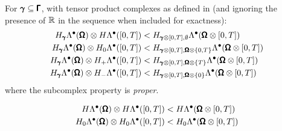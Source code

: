             \noindent\makebox[\linewidth]{\rule{\textwidth}{0.4pt}}
            \begin{lemma}
                For $\pmb{\mathsf{\gamma}}  \subseteq  \pmb{\mathsf{\Gamma}}$, with tensor product complexes as defined in \cite{ABB15} (and ignoring the presence of $\mathbb{R}$ in the sequence when included for exactness):
                \begin{align}
                    H_{\pmb{\mathsf{\gamma}}}\Lambda^{\bullet}(\pmb{\mathsf{\Omega}})\otimes H\Lambda^{\bullet}([0, T])  &<  H_{\pmb{\mathsf{\gamma}}\otimes[0, T], \emptyset}\Lambda^{\bullet}(\pmb{\mathsf{\Omega}}\otimes[0, T])  \\
                    H_{\pmb{\mathsf{\gamma}}}\Lambda^{\bullet}(\pmb{\mathsf{\Omega}})\otimes H_{0}\Lambda^{\bullet}([0, T])  &<  H_{\pmb{\mathsf{\gamma}}\otimes[0, T], \pmb{\mathsf{\Omega}}\otimes\{0, T\}}\Lambda^{\bullet}(\pmb{\mathsf{\Omega}}\otimes[0, T])  \\
                    H_{\pmb{\mathsf{\gamma}}}\Lambda^{\bullet}(\pmb{\mathsf{\Omega}})\otimes H_{+}\Lambda^{\bullet}([0, T])  &<  H_{\pmb{\mathsf{\gamma}}\otimes[0, T], \pmb{\mathsf{\Omega}}\otimes\{T\}}\Lambda^{\bullet}(\pmb{\mathsf{\Omega}}\otimes[0, T])  \\
                    H_{\pmb{\mathsf{\gamma}}}\Lambda^{\bullet}(\pmb{\mathsf{\Omega}})\otimes H_{-}\Lambda^{\bullet}([0, T])  &<  H_{\pmb{\mathsf{\gamma}}\otimes[0, T], \pmb{\mathsf{\Omega}}\otimes\{0\}}\Lambda^{\bullet}(\pmb{\mathsf{\Omega}}\otimes[0, T])
                \end{align}
                where the subcomplex property is \emph{proper}.
            \end{lemma}

            \begin{corollary}\label{cor:tensor product complex inclusion}
                \begin{align}
                    H\Lambda^{\bullet}(\pmb{\mathsf{\Omega}})\otimes H\Lambda^{\bullet}([0, T])  &<  H\Lambda^{\bullet}(\pmb{\mathsf{\Omega}}\otimes[0, T])  \\
                    H_{0}\Lambda^{\bullet}(\pmb{\mathsf{\Omega}})\otimes H_{0}\Lambda^{\bullet}([0, T])  &<  H_{0}\Lambda^{\bullet}(\pmb{\mathsf{\Omega}}\otimes[0, T])
                \end{align}
            \end{corollary}
            \noindent\makebox[\linewidth]{\rule{\textwidth}{0.4pt}}
    